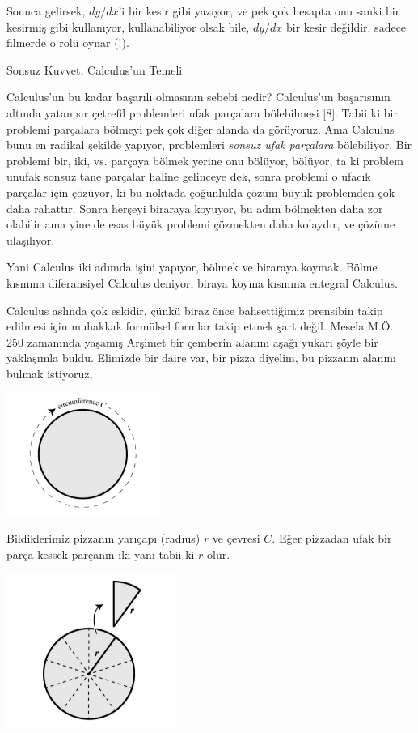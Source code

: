 \documentclass[12pt,fleqn]{article}\usepackage{../../common}
\begin{document}
Sonuca gelirsek, $dy/dx$'i bir kesir gibi yazıyor, ve pek çok hesapta onu
sanki bir kesirmiş gibi kullanıyor, kullanabiliyor olsak bile, $dy/dx$ bir
kesir değildir, sadece filmerde o rolü oynar (!).

Sonsuz Kuvvet, Calculus'un Temeli

Calculus'un bu kadar başarılı olmasının sebebi nedir? Calculus'un
başarısının altında yatan sır çetrefil problemleri ufak parçalara
bölebilmesi [8]. Tabii ki bir problemi parçalara bölmeyi pek çok diğer
alanda da görüyoruz. Ama Calculus bunu en radikal şekilde yapıyor,
problemleri {\em sonsuz ufak parçalara} bölebiliyor. Bir problemi bir, iki,
vs. parçaya bölmek yerine onu bölüyor, bölüyor, ta ki problem unufak sonsuz
tane parçalar haline gelinceye dek, sonra problemi o ufacık parçalar için
çözüyor, ki bu noktada çoğunlukla çözüm büyük problemden çok daha rahattır.
Sonra herşeyi biraraya koyuyor, bu adım bölmekten daha zor olabilir ama
yine de esas büyük problemi çözmekten daha kolaydır, ve çözüme ulaşılıyor.

Yani Calculus iki adımda işini yapıyor, bölmek ve biraraya koymak. Bölme
kısmına diferansiyel Calculus deniyor, biraya koyma kısmına entegral
Calculus.

Calculus aslında çok eskidir, çünkü biraz önce bahsettiğimiz prensibin
takip edilmesi için muhakkak formülsel formlar takip etmek şart
değil. Mesela M.Ö. 250 zamanında yaşamış Arşimet bir çemberin alanını aşağı
yukarı şöyle bir yaklaşımla buldu. Elimizde bir daire var, bir pizza
diyelim, bu pizzanın alanını bulmak istiyoruz,

\includegraphics[height=4cm]{circ_1.png}

Bildiklerimiz pizzanın yarıçapı (radıus) $r$ ve çevresi $C$. Eğer pizzadan
ufak bir parça kessek parçanın iki yanı tabii ki $r$ olur.

\includegraphics[height=5cm]{circ_2.png}
\end{document}
